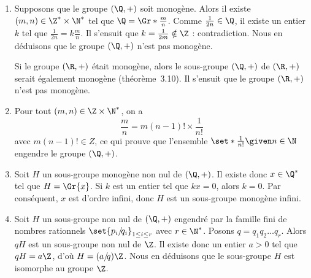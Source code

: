 \begin{enumerate}
  \item
    Supposons que le groupe $(\Q,+)$ soit monogène.
    Alors il existe $(m,n)\in\Z^*\times\N^*$ tel que $\Q = \Gr*{\frac{m}{n}}$.
    Comme $\frac{1}{2n}\in\Q$, il existe un entier $k$ tel que $\frac{1}{2n} = k\frac{m}{n}$.
    Il s'ensuit que $k = \frac{1}{2m}\notin\Z$ : contradiction.
    Nous en déduisons que le groupe $(\Q,+)$ n'est pas monogène.

    Si le groupe $(\R,+)$ était monogène, alors le sous-groupe $(\Q,+)$ de $(\R,+)$ serait également monogène (théorème~3.10).
    Il s'ensuit que le groupe $(\R,+)$ n'est pas monogène.
  \item
    Pour tout $(m,n)\in\Z\times\N^*$, on a
    \[
      \frac{m}{n} = m(n - 1)!\times\frac{1}{n!}
    \]
    avec $m(n - 1)!\in Z$, ce qui prouve que l'ensemble $\set*{\frac{1}{n!}\given n\in\N}$ engendre le groupe $(\Q,+)$.
  \item
    Soit $H$ un sous-groupe monogène non nul de $(\Q,+)$.
    Il existe donc $x\in\Q^*$ tel que $H = \Gr{x}$.
    Si $k$ est un entier tel que $kx = 0$, alors $k = 0$.
    Par conséquent, $x$ est d'ordre infini, donc $H$ est un sous-groupe monogène infini.
  \item
    Soit $H$ un sous-groupe non nul de $(\Q,+)$ engendré par la famille fini de nombres rationnels $\set{p_i/\!q_i}_{1\leq i\leq r}$ avec $r\in\N^*$.
    Posons $q = q_1q_2\dots q_r$.
    Alors $qH$ est un sous-groupe non nul de $\Z$.
    Il existe donc un entier $a > 0$ tel que $qH = a\Z$, d'où $H = (a/\!q)\Z$.
    Nous en déduisons que le sous-groupe $H$ est isomorphe au groupe $\Z$.
\end{enumerate}
